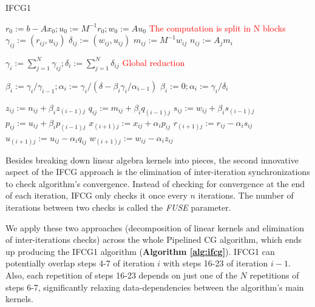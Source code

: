 \begin{algorithm}[t]
\caption{IFCG1}
\label{alg:ifcg}
{\fontsize{9}{9}\selectfont
\begin{algorithmic}[1]
        \State $r_{0} := b - Ax_{0}; u_{0} := M^{-1}r_{0}; w_{0} := Au_{0}$
                \Comment \textcolor{red}{The computation is split in N blocks}
                        \State $\gamma_{ij} := (r_{ij}, u_{ij})$
                        \State $\delta_{ij} := (w_{ij}, u_{ij})$
                        \State $m_{ij} := M^{-1}w_{ij}$
                        \State $n_{ij} := A_{j}m_{i}$
                \EndFor

                \State $\gamma_{i} := \sum\limits_{j=1}^N \gamma_{ij}; \delta_i := \sum\limits_{j=1}^N \delta_{ij}$
                \Comment \textcolor{red}{Global reduction}

                        \State $\beta_{i} := \gamma_{i}/\gamma_{i-1}; \alpha_{i} := \gamma_{i}/(\delta - \beta_{i}\gamma_{i}/\alpha_{i-1})$
                \Else
                        \State $\beta_{i} := 0; \alpha_{i} := \gamma_{i}/\delta_i$
                \EndIf

                        \State $z_{ij} := n_{ij} + \beta_{i}z_{(i-1)j}$
                        \State $q_{ij} := m_{ij} + \beta_{i}q_{(i-1)j}$
                        \State $s_{ij} := w_{ij} + \beta_{i}s_{(i-1)j}$
                        \State $p_{ij} := u_{ij} + \beta_{i}p_{(i-1)j}$
                        \State $x_{(i+1)j} := x_{ij} + \alpha_{i}p_{ij}$
                        \State $r_{(i+1)j} := r_{ij} - \alpha_{i}s_{ij}$
                        \State $u_{(i+1)j} := u_{ij} - \alpha_{i}q_{ij}$
                        \State $w_{(i+1)j} := w_{ij} - \alpha_{i}z_{ij}$
                \EndFor
        \EndFor
\end{algorithmic}
}
\end{algorithm}

Besides breaking down linear algebra kernels into pieces, the second innovative aspect of the IFCG approach is the elimination of inter-iteration synchronizations to check algorithm's convergence.
Instead of checking for convergence at the end of each iteration, IFCG only checks it once every $n$ iterations.
The number of iterations between two checks is called the \emph{FUSE} parameter.

We apply these two approaches (decomposition of linear kernels and elimination of inter-iterations checks) across the whole Pipelined CG algorithm, which ends up producing the IFCG1 algorithm (\textbf{Algorithm \ref{alg:ifcg}}). 
IFCG1 can potentially overlap steps 4-7 of iteration $i$ with steps 16-23 of iteration $i-1$. 
Also, each repetition of steps 16-23 depends on just one of the $N$ repetitions of steps 6-7, significantly relaxing data-dependencies between the algorithm's main kernels.

